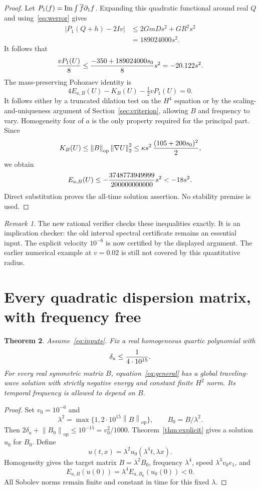 \documentclass[11pt,a4paper]{article}
\newtheorem{theorem}{Theorem}[section]
\theoremstyle{remark}\newtheorem{remark}[theorem]{Remark}
\newcommand{\norm}[1]{\left\|#1\right\|}
\begin{document}
\begin{proof}
Let $P_1(f)=\operatorname{Im}\int\overline f\partial_1f$. Expanding this quadratic functional around real $Q$ and using~\eqref{eq:werror} gives
\begin{align*}
 |P_1(Q+h)-2Iv|
 &\le 2GmDs^2+GR^2s^2\\
 &=189024000s^2.
\end{align*}
It follows that
\[
 {vP_1(U)\over8}\le{-350+189024000s_0\over8}s^2
 =-20.122s^2.
\]
The mass-preserving Pohozaev identity is
\begin{equation}\label{eq:pohoB}
 4E_{a,B}(U)-K_B(U)-\tfrac12vP_1(U)=0.
\end{equation}
It follows either by a truncated dilation test on the $H^4$ equation or by the scaling-and-uniqueness argument of Section~\ref{sec:criterion}, allowing $B$ and frequency to vary. Homogeneity four of $a$ is the only property required for the principal part. Since
\[
 K_B(U)\le\norm B_{\mathrm{op}}\norm{\nabla U}_2^2
 \le\kappa s^2\,{(105+200s_0)^2\over2},
\]
we obtain
\[
 E_{a,B}(U)\le
 -{3748773949999\over200000000000}s^2
 <-18s^2.
\]
Direct substitution proves the all-time solution assertion. No stability premise is used.
\end{proof}

\begin{remark}
The new rational verifier checks these inequalities exactly. It is an implication checker: the old interval spectral certificate remains an essential input. The explicit velocity $10^{-6}$ is now certified by the displayed argument. The earlier numerical example at $v=0.02$ is still not covered by this quantitative radius.
\end{remark}

\section{Every quadratic dispersion matrix, with frequency free}
\begin{theorem}\label{thm:allB}
Assume~\eqref{eq:inputs}. Fix a real homogeneous quartic polynomial with
\[
 \delta_a\le {1\over4\cdot10^{15}}.
\]
For every real symmetric matrix $B$, equation~\eqref{eq:general} has a global traveling-wave solution with strictly negative energy and constant finite $H^2$ norm. Its temporal frequency is allowed to depend on $B$.
\end{theorem}
\begin{proof}
Set $v_0=10^{-6}$ and
\[
 \lambda^2=\max\{1,2\cdot10^{15}\norm B_{\mathrm{op}}\},\qquad B_0=B/\lambda^2.
\]
Then $2\delta_a+\norm{B_0}_{\mathrm{op}}\le10^{-15}=v_0^2/1000$. Theorem~\ref{thm:explicit} gives a solution $u_0$ for $B_0$. Define
\[
 u(t,x)=\lambda^2u_0(\lambda^4t,\lambda x).
\]
Homogeneity gives the target matrix $B=\lambda^2B_0$, frequency $\lambda^4$, speed $\lambda^3v_0e_1$, and
\[
 E_{a,B}(u(0))=\lambda^4E_{a,B_0}(u_0(0))<0.
\]
All Sobolev norms remain finite and constant in time for this fixed $\lambda$.
\end{proof}
\end{document}
